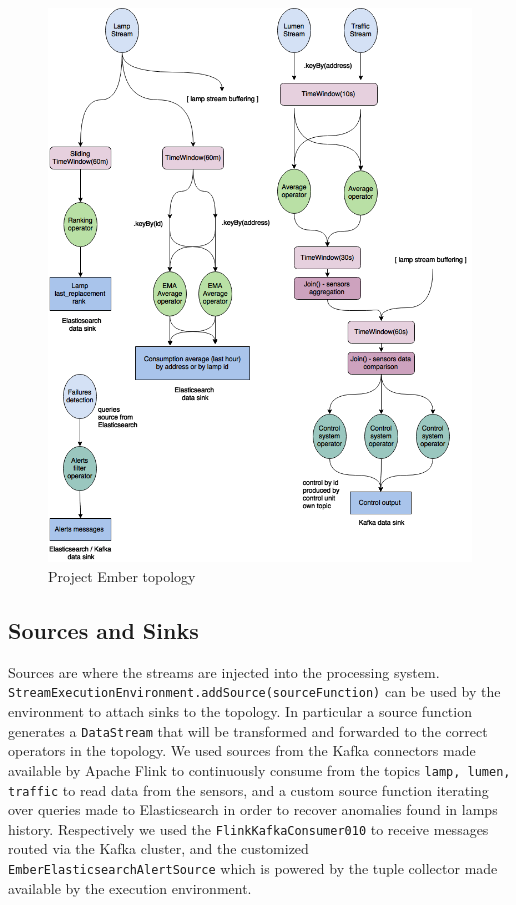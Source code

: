 \begin{figure}
\begin{center}
	\includegraphics[scale=0.3]{img/ember_topology}
	\caption{Project Ember topology}
	\label{fig:ember_topology}
\end{center}
\end{figure}


\subsection{Sources and Sinks}
Sources are where the streams are injected into the processing system. \texttt{StreamExecutionEnvironment.addSource(sourceFunction)} can be used by the environment to attach sinks to the topology. In particular a source function generates a \texttt{DataStream} that will be transformed and forwarded to the correct operators in the topology. We used sources from the Kafka connectors made available by Apache Flink to continuously consume from the topics \texttt{lamp, lumen, traffic} to read data from the sensors, and a custom source function iterating over queries made to Elasticsearch in order to recover anomalies found in lamps history. Respectively we used the \texttt{FlinkKafkaConsumer010} to receive messages routed via the Kafka cluster, and the customized \texttt{EmberElasticsearchAlertSource} which is powered by the tuple collector made available by the execution environment.

